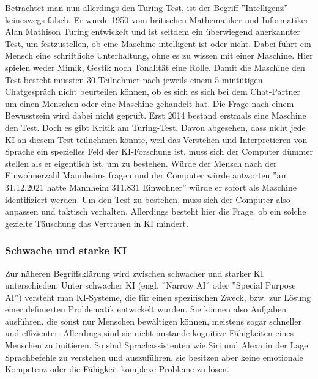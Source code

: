 \documentclass[a4paper,12pt, german]{report}
\begin{document}
Betrachtet man nun allerdings den Turing-Test, ist der Begriff ''Intelligenz'' keineswegs falsch.  Er wurde 1950 vom britischen Mathematiker und Informatiker Alan Mathison Turing entwickelt und ist seitdem ein überwiegend anerkannter Test, um festzustellen, ob eine Maschine intelligent ist oder nicht.
Dabei führt ein Mensch eine schriftliche Unterhaltung, ohne es zu wissen mit einer Maschine. Hier spielen weder Mimik, Gestik noch Tonalität eine Rolle. Damit die Maschine den Test besteht müssten 30 Teilnehmer nach jeweils einem 5-mintütigen Chatgespräch nicht beurteilen können, ob es sich es sich bei dem Chat-Partner um einen Menschen oder eine Maschine gehandelt hat. Die Frage nach einem Bewusstsein wird dabei nicht geprüft. Erst 2014 bestand erstmals eine Maschine den Test. \newline
Doch es gibt Kritik am Turing-Test. Davon abgesehen, dass nicht jede KI an diesem Test teilnehmen könnte, weil das Verstehen und Interpretieren von Sprache ein spezielles Feld der KI-Forschung ist, muss sich der Computer dümmer stellen als er eigentlich ist, um zu bestehen. Würde der Mensch nach der Einwohnerzahl Mannheims fragen und der Computer würde antworten ''am 31.12.2021 hatte Mannheim 311.831 Einwohner'' würde er sofort als Maschine identifiziert werden. Um den Test zu bestehen, muss sich der Computer also anpassen und taktisch verhalten. Allerdings besteht hier die Frage, ob ein solche gezielte Täuschung das Vertrauen in KI mindert. \cite{02}

\subsubsection{Schwache und starke KI}


Zur näheren Begriffsklärung wird zwischen schwacher und starker KI unterschieden. Unter schwacher KI (engl. ''Narrow AI'' oder ''Special Purpose AI'')  versteht man KI-Systeme, die für einen spezifischen Zweck, bzw. zur Lösung einer definierten Problematik entwickelt wurden. Sie können also Aufgaben ausführen, die sonst nur Menschen bewältigen können, meistens sogar schneller und effizienter. Allerdings sind sie nicht imstande kognitive Fähigkeiten eines Menschen zu imitieren. So sind Sprachassistenten wie Siri und Alexa in der Lage Sprachbefehle zu verstehen und auszuführen, sie besitzen aber keine emotionale Kompetenz oder die Fähigkeit komplexe Probleme zu lösen. \cite{01}\cite{15}
\end{document}
